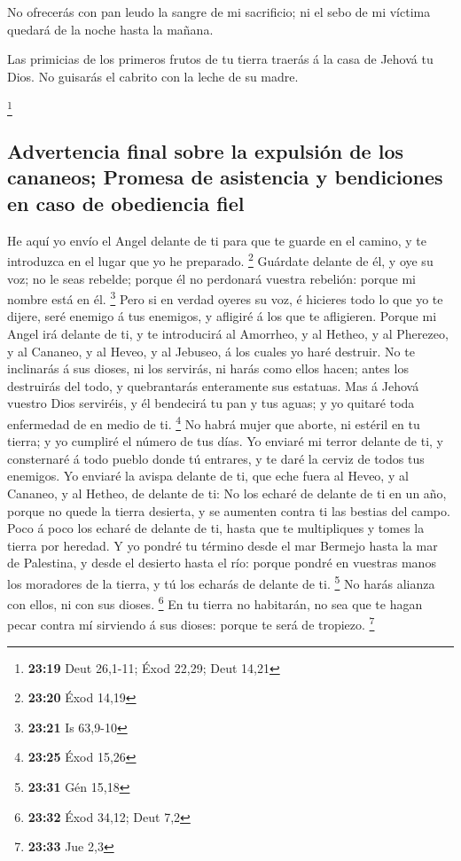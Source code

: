  No ofrecerás con pan leudo la sangre de mi sacrificio;
ni el sebo de mi víctima quedará de la noche hasta la mañana.

 Las primicias de los primeros frutos de tu tierra
traerás á la casa de Jehová tu Dios. No guisarás el cabrito con la leche
de su madre.

\footnote{\textbf{23:19} Deut 26,1-11; Éxod 22,29; Deut 14,21}

\hypertarget{advertencia-final-sobre-la-expulsiuxf3n-de-los-cananeos-promesa-de-asistencia-y-bendiciones-en-caso-de-obediencia-fiel}{%
\subsection{Advertencia final sobre la expulsión de los cananeos;
Promesa de asistencia y bendiciones en caso de obediencia
fiel}\label{advertencia-final-sobre-la-expulsiuxf3n-de-los-cananeos-promesa-de-asistencia-y-bendiciones-en-caso-de-obediencia-fiel}}

 He aquí yo envío el Angel delante de ti para que te
guarde en el camino, y te introduzca en el lugar que yo he preparado.
\footnote{\textbf{23:20} Éxod 14,19}  Guárdate delante de
él, y oye su voz; no le seas rebelde; porque él no perdonará vuestra
rebelión: porque mi nombre está en él. \footnote{\textbf{23:21} Is
  63,9-10}  Pero si en verdad oyeres su voz, é hicieres
todo lo que yo te dijere, seré enemigo á tus enemigos, y afligiré á los
que te afligieren.  Porque mi Angel irá delante de ti, y
te introducirá al Amorrheo, y al Hetheo, y al Pherezeo, y al Cananeo, y
al Heveo, y al Jebuseo, á los cuales yo haré destruir. 
No te inclinarás á sus dioses, ni los servirás, ni harás como ellos
hacen; antes los destruirás del todo, y quebrantarás enteramente sus
estatuas.  Mas á Jehová vuestro Dios serviréis, y él
bendecirá tu pan y tus aguas; y yo quitaré toda enfermedad de en medio
de ti. \footnote{\textbf{23:25} Éxod 15,26}  No habrá
mujer que aborte, ni estéril en tu tierra; y yo cumpliré el número de
tus días.  Yo enviaré mi terror delante de ti, y
consternaré á todo pueblo donde tú entrares, y te daré la cerviz de
todos tus enemigos.  Yo enviaré la avispa delante de ti,
que eche fuera al Heveo, y al Cananeo, y al Hetheo, de delante de ti:
 No los echaré de delante de ti en un año, porque no
quede la tierra desierta, y se aumenten contra ti las bestias del campo.
 Poco á poco los echaré de delante de ti, hasta que te
multipliques y tomes la tierra por heredad.  Y yo pondré
tu término desde el mar Bermejo hasta la mar de Palestina, y desde el
desierto hasta el río: porque pondré en vuestras manos los moradores de
la tierra, y tú los echarás de delante de ti. \footnote{\textbf{23:31}
  Gén 15,18}  No harás alianza con ellos, ni con sus
dioses. \footnote{\textbf{23:32} Éxod 34,12; Deut 7,2} 
En tu tierra no habitarán, no sea que te hagan pecar contra mí sirviendo
á sus dioses: porque te será de tropiezo. \footnote{\textbf{23:33} Jue
  2,3}

